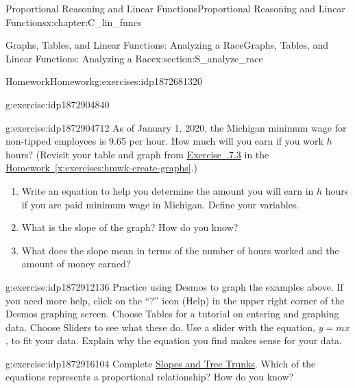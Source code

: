 \documentclass[oneside,10pt,]{book}
\newcommand{\xreffont}{\relax}
\numberwithin{equation}{chapter}
\begin{document}
\begin{chapterptx}{Proportional Reasoning and Linear Functions}{}{Proportional Reasoning and Linear Functions}{}{}{x:chapter:C_lin_funcs}
\begin{sectionptx}{Graphs, Tables, and Linear Functions: Analyzing a Race}{}{Graphs, Tables, and Linear Functions: Analyzing a Race}{}{}{x:section:S_analyze_race}
\begin{exercises-subsection}{Homework}{}{Homework}{}{}{g:exercises:idp1872681320}
\begin{divisionexercise}{5}{}{}{g:exercise:idp1872904840}
\begin{enumerate}[font=\bfseries,label=(\alph*),ref=\alph*]
\end{enumerate}
\end{divisionexercise}%
%
%
\begin{divisionexercise}{6}{}{}{g:exercise:idp1872904712}%
As of January 1, 2020, the Michigan minimum wage for non-tipped employees is \textdollar{}9.65 per hour. How much will you earn if you work \(h\) hours? (Revisit your table and graph from \hyperlink{x:exercise:exer-wages-22}{Exercise~{\xreffont 2.2.7.3}} in the \hyperref[x:exercises:hmwk-create-graphs]{Homework~{\xreffont\ref{x:exercises:hmwk-create-graphs}}}.)%
\begin{enumerate}[font=\bfseries,label=(\alph*),ref=\alph*]
\item{}Write an equation to help you determine the amount you will earn in \(h\) hours if you are paid minimum wage in Michigan. Define your variables.%
\item{}What is the slope of the graph? How do you know?%
\item{}What does the slope mean in terms of the number of hours worked and the amount of money earned?%
\end{enumerate}
\end{divisionexercise}%
\begin{divisionexercise}{7}{}{}{g:exercise:idp1872912136}%
Practice using Desmos to graph the examples above. If you need more help, click on the ``?'' icon (Help) in the upper right corner of the Desmos graphing screen. Choose Tables for a tutorial on entering and graphing data. Choose Sliders to see what these do. Use a slider with the equation, \(y = mx\), to fit your data. Explain why the equation you find makes sense for your data.%
\end{divisionexercise}%
\begin{divisionexercise}{8}{}{}{g:exercise:idp1872916104}%
Complete \hyperref[x:worksheet:act-slope-trees]{Slopes and Tree Trunks}. Which of the equations represents a proportional relationship? How do you know?%
\end{divisionexercise}%
\end{exercises-subsection}
%
%
\typeout{************************************************}

\end{sectionptx}
\end{chapterptx}
\end{document}
